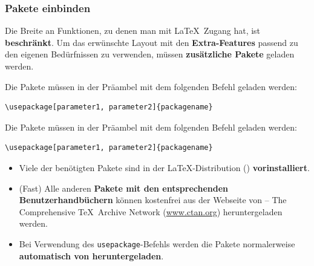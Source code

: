 \begin{frame}[fragile]
\frametitle{Pakete einbinden}

Die Breite an Funktionen, zu denen man mit \LaTeX\ Zugang hat, ist \textbf{beschränkt}. Um das erwünschte Layout mit den \textbf{Extra-Features} passend zu den eigenen Bedürfnissen zu verwenden, müssen \textbf{zusätzliche Pakete} geladen werden.


Die Pakete müssen in der Präambel mit dem folgenden Befehl geladen werden:
\begin{lstlisting}
\usepackage[parameter1, parameter2]{packagename}
\end{lstlisting}



\end{frame}


\begin{frame}[fragile]


Die Pakete müssen in der Präambel mit dem folgenden Befehl geladen werden:
\begin{lstlisting}
\usepackage[parameter1, parameter2]{packagename}
\end{lstlisting}


\begin{itemize}
	\item Viele der benötigten Pakete sind in der \LaTeX -Distribution (\zB \href{http://miktex.org/}{}) \textbf{vorinstalliert}. 
	
	\item (Fast) Alle anderen \textbf{Pakete mit den entsprechenden Benutzerhandbüchern} können kostenfrei aus der Webseite von \textbf{} -- The Comprehensive \TeX\ Archive Network (\href{http://www.ctan.org/}{www.ctan.org}) heruntergeladen werden.
	
	\item Bei Verwendung des \lstinline|usepackage|-Befehls werden die Pakete normalerweise \textbf{automatisch von  heruntergeladen}.
	
\end{itemize}
\end{frame}


